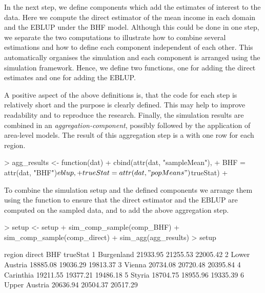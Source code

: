 \documentclass[article]{ajs}
\newcommand{\red}[1]{\color{red} #1 \color{black} }
\begin{document}
\red{In the next step, we define components which add the estimates of interest to the data. Here we compute the direct estimator of the mean income in each domain and the EBLUP under the BHF model. Although this could be done in one step, we separate the two computations to illustrate how to combine several estimations and how to define each component independent of each other. This automatically organises the simulation and each component is arranged using the simulation framework. Hence, we define two functions, one for adding the direct estimates and one for adding the EBLUP.}

\begin{Schunk}
\end{Schunk}

A positive aspect of the above definitions is, that the code for each step is relatively short and the purpose is clearly defined. This may help to improve readability and to reproduce the research. Finally, the simulation results are combined in an \textit{aggregation-component}, possibly followed by the application of area-level models. The result of this aggregation step is a  with one row for each region.

\begin{Schunk}
\begin{Sinput}
> agg_results <- function(dat) {
+   cbind(attr(dat, "sampleMean"),
+         BHF = attr(dat, "BHF")$eblup,
+         trueStat = attr(dat, "popMeans")$trueStat)
+ }
\end{Sinput}
\end{Schunk}

To combine the simulation setup and the defined components we arrange them using the function  to ensure that the direct estimator and the EBLUP are computed on the sampled data, and  to add the above aggregation step.

\begin{Schunk}
\begin{Sinput}
> setup <- setup %
+   sim_comp_sample(comp_BHF) %
+   sim_comp_sample(comp_direct) %
+   sim_agg(agg_results)
> setup
\end{Sinput}
\begin{Soutput}
         region   direct      BHF trueStat
1    Burgenland 21933.95 21255.53 22005.42
2 Lower Austria 18885.08 19036.29 19813.37
3        Vienna 20734.08 20720.48 20395.84
4     Carinthia 19211.55 19377.21 19486.18
5        Styria 18704.75 18955.96 19335.39
6 Upper Austria 20636.94 20504.37 20517.29
\end{Soutput}
\end{Schunk}
\end{document}

